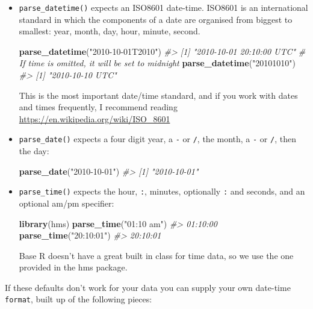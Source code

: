 \documentclass[]{book}
\newenvironment{Shaded}{\begin{snugshade}}{\end{snugshade}}
\newcommand{\KeywordTok}[1]{\textcolor[rgb]{0.13,0.29,0.53}{\textbf{{#1}}}}
\newcommand{\StringTok}[1]{\textcolor[rgb]{0.31,0.60,0.02}{{#1}}}
\newcommand{\CommentTok}[1]{\textcolor[rgb]{0.56,0.35,0.01}{\textit{{#1}}}}
\newcommand{\NormalTok}[1]{{#1}}
\begin{document}
\begin{itemize}
\item
  \texttt{parse\_datetime()} expects an ISO8601 date-time. ISO8601 is an
  international standard in which the components of a date are organised
  from biggest to smallest: year, month, day, hour, minute, second.

\begin{Shaded}
\begin{Highlighting}[]
\KeywordTok{parse_datetime}\NormalTok{(}\StringTok{"2010-10-01T2010"}\NormalTok{)}
\CommentTok{#> [1] "2010-10-01 20:10:00 UTC"}
\CommentTok{# If time is omitted, it will be set to midnight}
\KeywordTok{parse_datetime}\NormalTok{(}\StringTok{"20101010"}\NormalTok{)}
\CommentTok{#> [1] "2010-10-10 UTC"}
\end{Highlighting}
\end{Shaded}

  This is the most important date/time standard, and if you work with
  dates and times frequently, I recommend reading
  \url{https://en.wikipedia.org/wiki/ISO_8601}
\item
  \texttt{parse\_date()} expects a four digit year, a \texttt{-} or
  \texttt{/}, the month, a \texttt{-} or \texttt{/}, then the day:

\begin{Shaded}
\begin{Highlighting}[]
\KeywordTok{parse_date}\NormalTok{(}\StringTok{"2010-10-01"}\NormalTok{)}
\CommentTok{#> [1] "2010-10-01"}
\end{Highlighting}
\end{Shaded}
\item
  \texttt{parse\_time()} expects the hour, \texttt{:}, minutes,
  optionally \texttt{:} and seconds, and an optional am/pm specifier:

\begin{Shaded}
\begin{Highlighting}[]
\KeywordTok{library}\NormalTok{(hms)}
\KeywordTok{parse_time}\NormalTok{(}\StringTok{"01:10 am"}\NormalTok{)}
\CommentTok{#> 01:10:00}
\KeywordTok{parse_time}\NormalTok{(}\StringTok{"20:10:01"}\NormalTok{)}
\CommentTok{#> 20:10:01}
\end{Highlighting}
\end{Shaded}

  Base R doesn't have a great built in class for time data, so we use
  the one provided in the hms package.
\end{itemize}

If these defaults don't work for your data you can supply your own
date-time \texttt{format}, built up of the following pieces:
\end{document}
